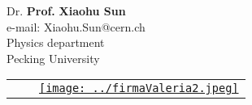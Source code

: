 \documentclass[12pt,a4paper,oneside]{extarticle}
\begin{document}
\vspace{1cm}
\noindent \makebox[0pt][l]{$\square$}{ } \hspace{2mm} Dr. \/ \makebox[0pt][l]{$\square$}{$\times$} \textbf{Prof.} \textbf{Xiaohu Sun}\\
e-mail: Xiaohu.Sun@cern.ch\\
Physics department \\
Pecking University \\

\vfill

\begin{tabular}{p{3cm} p{7cm} p{3cm}}
    & &\underline{\texttt{[image: ../firmaValeria2.jpeg]}}\\
\end{tabular}
\end{document}

